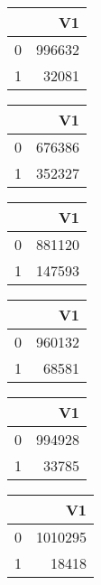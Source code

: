 \bigskip\bigskip
\centering
\begin{tabular}{rr}
  \hline
 & V1 \\ 
  \hline
0 & 996632 \\ 
  1 & 32081 \\ 
   \hline
\end{tabular}

\bigskip\bigskip
\centering
\begin{tabular}{rr}
  \hline
 & V1 \\ 
  \hline
0 & 676386 \\ 
  1 & 352327 \\ 
   \hline
\end{tabular}

\bigskip\bigskip
\centering
\begin{tabular}{rr}
  \hline
 & V1 \\ 
  \hline
0 & 881120 \\ 
  1 & 147593 \\ 
   \hline
\end{tabular}

\bigskip\bigskip
\centering
\begin{tabular}{rr}
  \hline
 & V1 \\ 
  \hline
0 & 960132 \\ 
  1 & 68581 \\ 
   \hline
\end{tabular}

\bigskip\bigskip
\centering
\begin{tabular}{rr}
  \hline
 & V1 \\ 
  \hline
0 & 994928 \\ 
  1 & 33785 \\ 
   \hline
\end{tabular}

\bigskip\bigskip
\centering
\begin{tabular}{rr}
  \hline
 & V1 \\ 
  \hline
0 & 1010295 \\ 
  1 & 18418 \\ 
   \hline
\end{tabular}

